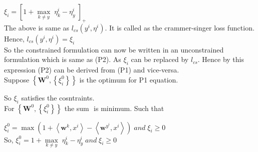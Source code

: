 \documentclass[a4paper,11pt]{article}
\begin{document}
\begin{mlsolution}
\begin{math}\xi_{i} =   \left [  1 + \underset{k\neq y}{\max} \;\eta_{k}^{i} - \eta_{y} ^{i}\;\right ]_{+}\end{math}\\

The above is same as \begin{math} l_{cs}\left ( y^{i},\eta ^{i} \right ) \end{math}. It is called as the crammer-singer loss function.\\

Hence, \begin{math} l_{cs}\left ( y^{i},\eta ^{i} \right ) = \xi _{i} \end{math}\\

So the constrained formulation can now be written in an unconstrained formulation which is same as (P2). As \begin{math} \xi _{i} \end{math} can be replaced by \begin{math} l_{cs}\end{math}. Hence by this expression (P2) can be derived from (P1) and vice-versa.\\

Suppose \begin{math} \left \{ \textbf{W}^{0}, \left \{ \xi _{i}^{0} \right \} \right \} \end{math} is the optimum for P1 equation.

So \begin{math}\xi_{i}\end{math} satisfies the cosntraints.\\

For \begin{math} \left \{ \textbf{W}^{0}, \left \{ \xi _{i}^{0} \right \} \right \} \end{math} the sum \begin{math}  \end{math} is minimum. Such that 

\begin{math}\xi_{i}^{0} =  \max \left ( 1 + \left \langle \textbf{w}^{k}, x^{i} \right \rangle - \left \langle \textbf{w}^{y^{i}}, x^{i} \right \rangle\right )  \;and\; \xi_{i}\geq 0
\end{math}\\

So, 
\begin{math}\xi_{i}^{0} =   1 + \underset{k\neq y}{\max} \;\eta_{k}^{i} - \eta_{y} ^{i}  \;and\; \xi_{i}\geq 0\end{math}


\end{mlsolution}
\end{document}
